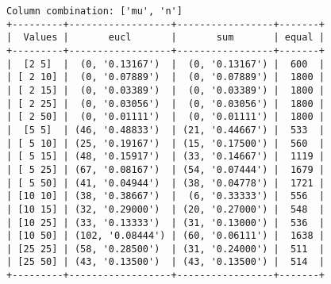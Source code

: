 \documentclass{article}
\begin{document}
\begin{verbatim}
Column combination: ['mu', 'n']
+---------+------------------+-----------------+-------+
|  Values |       eucl       |       sum       | equal |
+---------+------------------+-----------------+-------+
|  [2 5]  |  (0, '0.13167')  |  (0, '0.13167') |  600  |
| [ 2 10] |  (0, '0.07889')  |  (0, '0.07889') |  1800 |
| [ 2 15] |  (0, '0.03389')  |  (0, '0.03389') |  1800 |
| [ 2 25] |  (0, '0.03056')  |  (0, '0.03056') |  1800 |
| [ 2 50] |  (0, '0.01111')  |  (0, '0.01111') |  1800 |
|  [5 5]  | (46, '0.48833')  | (21, '0.44667') |  533  |
| [ 5 10] | (25, '0.19167')  | (15, '0.17500') |  560  |
| [ 5 15] | (48, '0.15917')  | (33, '0.14667') |  1119 |
| [ 5 25] | (67, '0.08167')  | (54, '0.07444') |  1679 |
| [ 5 50] | (41, '0.04944')  | (38, '0.04778') |  1721 |
| [10 10] | (38, '0.38667')  |  (6, '0.33333') |  556  |
| [10 15] | (32, '0.29000')  | (20, '0.27000') |  548  |
| [10 25] | (33, '0.13333')  | (31, '0.13000') |  536  |
| [10 50] | (102, '0.08444') | (60, '0.06111') |  1638 |
| [25 25] | (58, '0.28500')  | (31, '0.24000') |  511  |
| [25 50] | (43, '0.13500')  | (43, '0.13500') |  514  |
+---------+------------------+-----------------+-------+
\end{verbatim}
\end{document}
